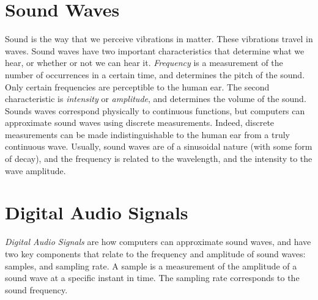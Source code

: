 

\section*{Sound Waves} %

Sound is the way that we perceive vibrations in matter.  These vibrations travel in waves.  Sound waves
have two important characteristics that determine what we hear, or whether or not we can hear it.
\emph{Frequency} is a measurement of the number of occurrences in a certain time, and determines the
pitch of the sound.  Only certain frequencies are perceptible to the human ear.  The second characteristic
is \emph{intensity} or \emph{amplitude}, and determines the volume of the sound.  Sounds waves correspond
physically to continuous functions, but computers can approximate sound waves using discrete measurements.
Indeed, discrete measurements can be made indistinguishable to the human ear from a truly continuous wave.
Usually, sound waves are of a sinusoidal nature (with some form of decay), and the frequency is related to
the wavelength, and the intensity to the wave amplitude.

\section*{Digital Audio Signals} %

\emph{Digital Audio Signals} are how computers can approximate sound waves, and have two key components that
relate to the frequency and amplitude of sound waves: samples, and sampling rate.  A sample is a measurement
of the amplitude of a sound wave at a specific instant in time.  The sampling rate corresponds to the sound
frequency.

